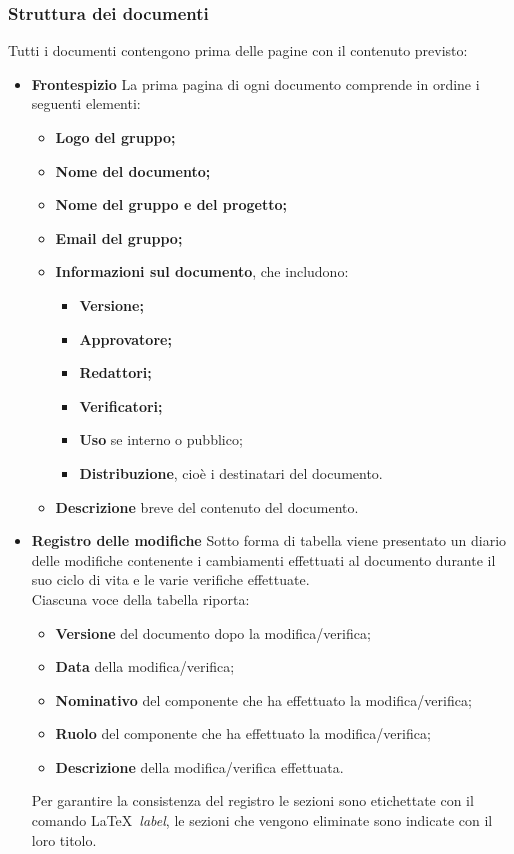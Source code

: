 \subsubsection{Struttura dei documenti}\label{StrutturaDocumenti}
Tutti i documenti contengono prima delle pagine con il contenuto previsto:
\begin{itemize}
\item \textbf{Frontespizio}
La prima pagina di ogni documento comprende in ordine i seguenti elementi:
\begin{itemize}
	\item \textbf{Logo del gruppo;}
	\item \textbf{Nome del documento;}
	\item \textbf{Nome del gruppo e del progetto;}
	\item \textbf{Email del gruppo;}
	\item \textbf{Informazioni sul documento}, che includono:
		\begin{itemize}
			\item \textbf{Versione;}
			\item \textbf{Approvatore;}
			\item \textbf{Redattori;}
			\item \textbf{Verificatori;}
			\item \textbf{Uso} se interno o pubblico;
			\item \textbf{Distribuzione}, cioè i destinatari del documento.
		\end{itemize}
	\item \textbf{Descrizione} breve del contenuto del documento.
\end{itemize}

\item\textbf{Registro delle modifiche}
Sotto forma di tabella viene presentato un diario delle modifiche contenente i cambiamenti effettuati al documento durante il suo ciclo di vita e le varie verifiche effettuate.\\
Ciascuna voce della tabella riporta:
\begin{itemize}
	\item \textbf{Versione} del documento dopo la modifica/verifica;
	\item \textbf{Data} della modifica/verifica;
	\item \textbf{Nominativo} del componente che ha effettuato la modifica/verifica;
	\item \textbf{Ruolo} del componente che ha effettuato la modifica/verifica;
	\item \textbf{Descrizione} della modifica/verifica effettuata.
\end{itemize}
Per garantire la consistenza del registro le sezioni sono etichettate con il comando \LaTeX\ \textit{label}, le sezioni che vengono eliminate sono indicate con il loro titolo.


\end{itemize}
